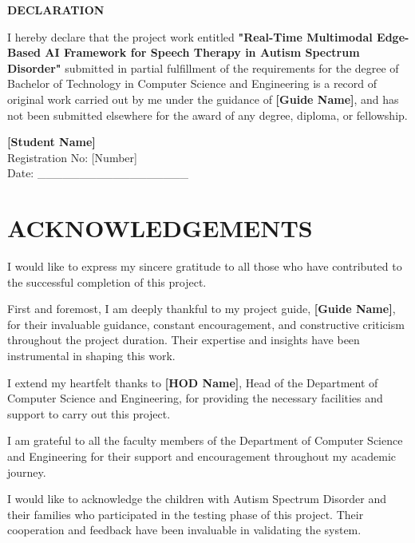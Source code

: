 \documentclass[12pt,a4paper]{article}
\begin{document}
\newpage
\thispagestyle{empty}
\begin{center}
\textbf{\Large DECLARATION}
\end{center}
\vspace{1cm}

I hereby declare that the project work entitled \textbf{"Real-Time Multimodal Edge-Based AI Framework for Speech Therapy in Autism Spectrum Disorder"} submitted in partial fulfillment of the requirements for the degree of Bachelor of Technology in Computer Science and Engineering is a record of original work carried out by me under the guidance of \textbf{[Guide Name]}, and has not been submitted elsewhere for the award of any degree, diploma, or fellowship.

\vspace{3cm}

\begin{flushright}
\textbf{[Student Name]} \\
Registration No: [Number] \\
Date: \_\_\_\_\_\_\_\_\_\_\_\_\_\_\_\_\_\_
\end{flushright}

\newpage
\thispagestyle{empty}
\section*{ACKNOWLEDGEMENTS}

I would like to express my sincere gratitude to all those who have contributed to the successful completion of this project.

First and foremost, I am deeply thankful to my project guide, \textbf{[Guide Name]}, for their invaluable guidance, constant encouragement, and constructive criticism throughout the project duration. Their expertise and insights have been instrumental in shaping this work.

I extend my heartfelt thanks to \textbf{[HOD Name]}, Head of the Department of Computer Science and Engineering, for providing the necessary facilities and support to carry out this project.

I am grateful to all the faculty members of the Department of Computer Science and Engineering for their support and encouragement throughout my academic journey.

I would like to acknowledge the children with Autism Spectrum Disorder and their families who participated in the testing phase of this project. Their cooperation and feedback have been invaluable in validating the system.
\end{document}
